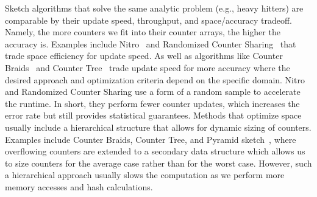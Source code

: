 Sketch algorithms that solve the same analytic problem (e.g., heavy hitters) are comparable by their update speed, throughput, and space/accuracy tradeoff. Namely, the more counters we fit into their counter arrays, the higher the accuracy is. Examples include Nitro~\cite{Nitro} and Randomized Counter Sharing~\cite{RandomizedCounterSharing} that trade space efficiency for update speed. As well as algorithms like
Counter Braids~\cite{CounterBraids} and Counter Tree~\cite{CounterTree} trade update speed for more accuracy where the desired approach and optimization criteria depend on the specific domain. Nitro and Randomized Counter Sharing use a form of a random sample to accelerate the runtime. In short, they perform fewer counter updates, which increases the error rate but still provides statistical guarantees. Methods that optimize space usually include a hierarchical structure that allows for dynamic sizing of counters. Examples include Counter Braids, Counter Tree, and Pyramid sketch~\cite{PyramidSketch, CounterTree,CounterBraids}, where overflowing counters are extended to a secondary data structure which allows us to size counters for the average case rather than for the worst case. However, such a hierarchical approach usually slows the computation as we perform more memory accesses and hash calculations.  
